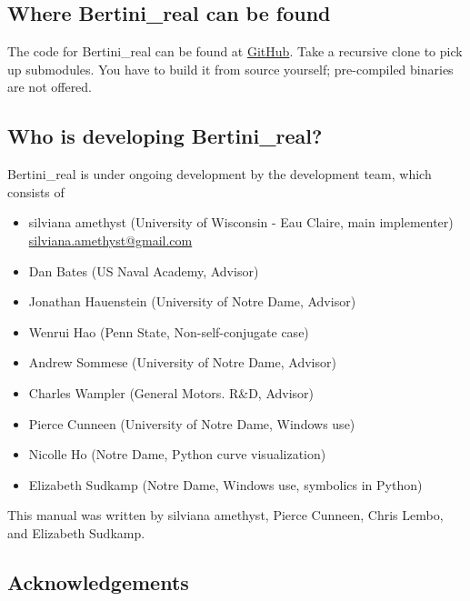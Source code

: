 \subsection{Where Bertini\_real can be found}
		
	The code for Bertini\_real can be found at \href{https://github.com/ofloveandhate/bertini_real}{GitHub}.  Take a recursive clone to pick up submodules.  You have to build it from source yourself; pre-compiled binaries are not offered. 


	\subsection{Who is developing Bertini\_real?}

	Bertini\_real is under ongoing development by the development team, which consists of 

	\begin{itemize}
		\item silviana amethyst (University of Wisconsin - Eau Claire, main implementer)  \\ \href{mailto:silviana.amethyst@gmail.com}{silviana.amethyst@gmail.com} 
		\item Dan Bates (US Naval Academy, Advisor)
		\item Jonathan Hauenstein (University of Notre Dame, Advisor)
		\item Wenrui Hao (Penn State, Non-self-conjugate case)
		\item Andrew Sommese (University of Notre Dame, Advisor)
		\item Charles Wampler (General Motors. R\&D, Advisor)
		\item Pierce Cunneen (University of Notre Dame, Windows use) 
		\item Nicolle Ho (Notre Dame, Python curve visualization)
		\item Elizabeth Sudkamp (Notre Dame, Windows use, symbolics in Python)
	\end{itemize}
	This manual was written by silviana amethyst, Pierce Cunneen, Chris Lembo, and Elizabeth Sudkamp.



\subsection{Acknowledgements}

